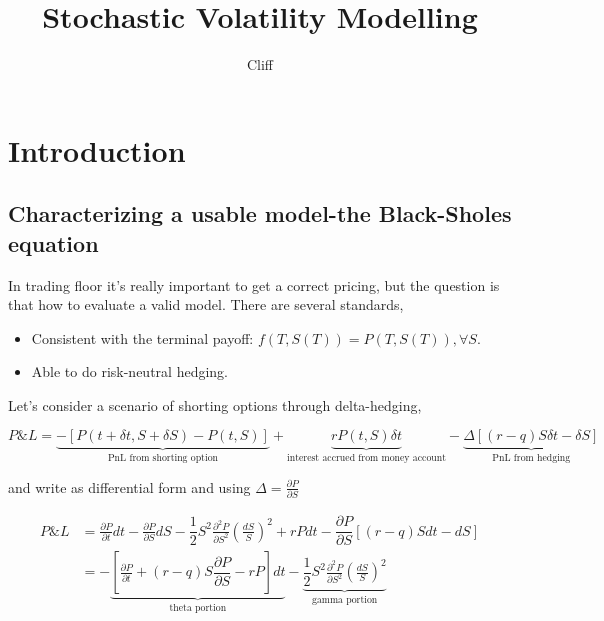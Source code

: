 \documentclass[a4]{article}
\title{Stochastic Volatility Modelling}
\author{Cliff}
\begin{document}
\tableofcontents
\newpage
\maketitle
\section{Introduction}
\subsection{Characterizing a usable model-the Black-Sholes equation}
In trading floor it's really important to get a correct pricing, but the question is that how to evaluate a valid model. There are several standards,\par 
\begin{itemize}
	\item Consistent with the terminal payoff: $f(T,S(T)) = P(T,S(T)),\forall S$.\\
	\item Able to do risk-neutral hedging.\\
\end{itemize}
Let's consider a scenario of shorting options through delta-hedging, \par 
\begin{equation}
P\&L = \underbrace{-[P(t+\delta t, S + \delta S) - P(t,S)]}_\text{PnL from shorting option} + \underbrace{rP(t,S)\delta t}_\text{interest accrued from money account} - \underbrace{\Delta [(r-q)S\delta t -\delta S]}_\text{PnL from hedging}
\end{equation}\par 
and write as differential form and using $\Delta = \frac{\partial P}{\partial S}$\par 
\begin{equation}
\begin{aligned}
P\&L &=\frac{\partial P}{\partial t}dt - \frac{\partial P}{\partial S}dS - \dfrac{1}{2}S^{2}\frac{\partial^{2} P}{\partial S^{2}}(\frac{d S}{S})^{2} + rPdt -  \dfrac{\partial P}{\partial S} [(r-q)Sdt - dS]\\
&=  -\underbrace{[\frac{\partial P}{\partial t} + (r-q)S\dfrac{\partial P}{\partial S} -rP]dt}_\text{theta portion}- \underbrace{\dfrac{1}{2}S^{2}\frac{\partial^{2} P}{\partial S^{2}}(\frac{d S}{S})^{2} }_\text{gamma portion}
\end{aligned}
\end{equation}\par
\bigbreak 
\end{document}
